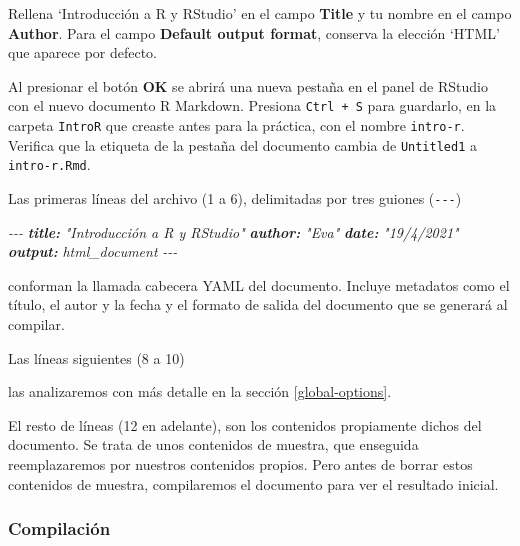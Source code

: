 \documentclass[
  title=normal,
  notoc,
  bib=normal]{mnye}
\newenvironment{Shaded}{\begin{snugshade}}{\end{snugshade}}
\newcommand{\AnnotationTok}[1]{\textcolor[rgb]{0.56,0.35,0.01}{\textbf{\textit{#1}}}}
\newcommand{\CommentTok}[1]{\textcolor[rgb]{0.56,0.35,0.01}{\textit{#1}}}
\newcommand{\InformationTok}[1]{\textcolor[rgb]{0.56,0.35,0.01}{\textbf{\textit{#1}}}}
\begin{document}
Rellena `Introducción a R y RStudio' en el campo \textbf{Title} y tu nombre en el campo \textbf{Author}. Para el campo \textbf{Default output format}, conserva la elección `HTML' que aparece por defecto.

Al presionar el botón \textbf{OK} se abrirá una nueva pestaña en el panel de \textsf{RStudio} con el nuevo documento R Markdown. Presiona \texttt{Ctrl\ +\ S} para guardarlo, en la carpeta \texttt{IntroR} que creaste antes para la práctica, con el nombre \texttt{intro-r}. Verifica que la etiqueta de la pestaña del documento cambia de \texttt{Untitled1} a \texttt{intro-r.Rmd}.

Las primeras líneas del archivo (1 a 6), delimitadas por tres guiones (\texttt{-\/-\/-})

\begin{Shaded}
\begin{Highlighting}[]
\CommentTok{{-}{-}{-}}
\AnnotationTok{title:}\CommentTok{ "Introducción a R y RStudio"}
\AnnotationTok{author:}\CommentTok{ "Eva"}
\AnnotationTok{date:}\CommentTok{ "19/4/2021"}
\AnnotationTok{output:}\CommentTok{ html\_document}
\CommentTok{{-}{-}{-}}
\end{Highlighting}
\end{Shaded}

conforman la llamada cabecera YAML del documento. Incluye metadatos como el título, el autor y la fecha y el formato de salida del documento que se generará al compilar.

Las líneas siguientes (8 a 10)

\begin{Shaded}
\end{Shaded}

las analizaremos con más detalle en la sección \ref{global-options}.

El resto de líneas (12 en adelante), son los contenidos propiamente dichos del documento. Se trata de unos contenidos de muestra, que enseguida reemplazaremos por nuestros contenidos propios. Pero antes de borrar estos contenidos de muestra, compilaremos el documento para ver el resultado inicial.

\hypertarget{compilaciuxf3n}{%
\subsubsection{Compilación}\label{compilaciuxf3n}}
\end{document}
